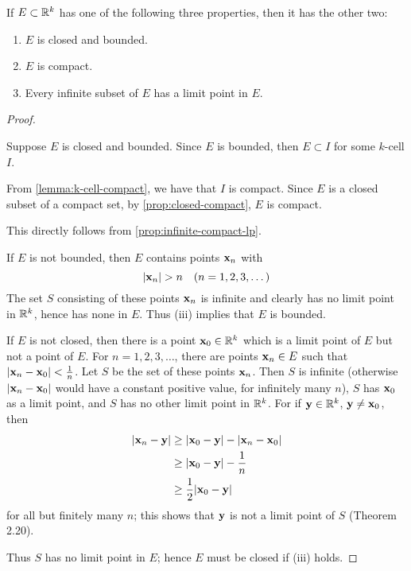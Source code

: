 \begin{proposition}\label{prop:closed-bounded-compact-inf-lp}
If $E\subset\mathbb R^k$ has one of the following three properties, then it has the other two:
\begin{enumerate}[label=(\roman*)]
\item $E$ is closed and bounded.
\item $E$ is compact.
\item Every infinite subset of $E$ has a limit point in $E$.
\end{enumerate}
\end{proposition}

\begin{proof} \

 Suppose $E$ is closed and bounded. Since $E$ is bounded, then $E\subset I$ for some $k$-cell $I$.

From \cref{lemma:k-cell-compact}, we have that $I$ is compact. Since $E$ is a closed subset of a compact set, by \cref{prop:closed-compact}, $E$ is compact.

 This directly follows from \cref{prop:infinite-compact-lp}.

 If $E$ is not bounded, then $E$ contains points $\vb{x}_n$ with
\[|\vb{x}_n|>n\quad(n=1,2,3,\dots)\]
The set $S$ consisting of these points $\vb{x}_n$ is infinite and clearly has no limit point in $\mathbb R^k$, hence has none in $E$. Thus (iii) implies that $E$ is bounded.

If $E$ is not closed, then there is a point $\vb{x}_0\in\mathbb R^k$ which is a limit point of $E$ but not a point of $E$. For $n=1,2,3,\dots$, there are points $\vb{x}_n\in E$ such that $|\vb{x}_n-\vb{x}_0|<\frac{1}{n}$. Let $S$ be the set of these points $\vb{x}_n$. Then $S$ is infinite (otherwise $|\vb{x}_n-\vb{x}_0|$ would have a constant positive value, for infinitely many $n$), $S$ has $\vb{x}_0$ as a limit point, and $S$ has no other limit point in $\mathbb R^k$. For if $\vb{y}\in\mathbb R^k$, $\vb{y}\neq\vb{x}_0$, then
\begin{align*}
|\vb{x}_n-\vb{y}|&\ge|\vb{x}_0-\vb{y}|-|\vb{x}_n-\vb{x}_0|\\
&\ge|\vb{x}_0-\vb{y}|-\frac{1}{n}\\
&\ge\frac{1}{2}|\vb{x}_0-\vb{y}|
\end{align*}
for all but finitely many $n$; this shows that $\vb{y}$ is not a limit point of $S$ (Theorem 2.20).

Thus $S$ has no limit point in $E$; hence $E$ must be closed if (iii) holds.
\end{proof}

